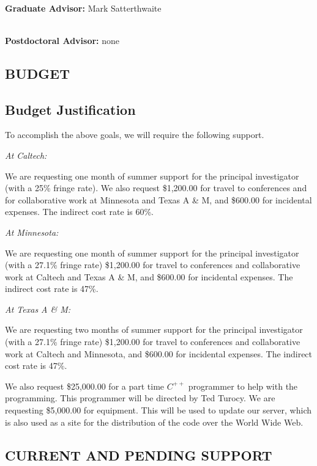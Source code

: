 \documentclass[12pt]{article}
\begin{document}
\ \\
\noindent
{\bf Graduate Advisor:} Mark Satterthwaite

\ \\
\noindent
{\bf Postdoctoral Advisor:} none

\newpage
\begin{center}
\section{BUDGET}
\end{center}
\newpage
\addtocounter{page}{3}
\subsection{Budget Justification}

To accomplish the above goals, we will require the following support. 

\medskip
\noindent 
{\em At Caltech:}  

We are requesting one month of summer support for the principal
investigator (with a 25\% fringe rate).  We also request \$1,200.00
for travel to conferences and for collaborative work at Minnesota and
Texas A \& M, and \$600.00 for incidental expenses.  The indirect cost
rate is 60\%.

\medskip
\noindent 
{\em At Minnesota:}

We are requesting one month of summer support for the principal
investigator (with a 27.1\% fringe rate) \$1,200.00 for travel to
conferences and collaborative work at Caltech and Texas A \& M,
and \$600.00 for incidental expenses.  The indirect cost rate is 47\%.

\medskip
\noindent 
{\em At Texas A \& M:}

We are requesting two months of summer support for the principal
investigator (with a 27.1\% fringe rate) \$1,200.00 for travel to
conferences and collaborative work at Caltech and Minnesota, and
\$600.00 for incidental expenses.  The indirect cost rate is 47\%.

\bigskip
We also request \$25,000.00 for a part time $C^{++}$ programmer to help
with the programming.  This programmer will be directed by Ted Turocy.
We are requesting \$5,000.00 for equipment.  This will be used to
update our server, which is also used as a site for the distribution
of the code over the World Wide Web.

\newpage
\begin{center}
\section{CURRENT AND PENDING SUPPORT}
\end{center}
\end{document}
